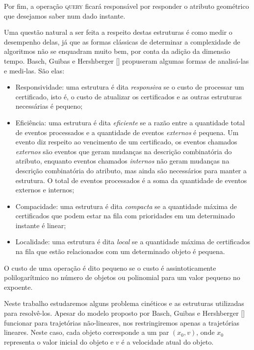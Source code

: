 Por fim, a operação \textsc{query} ficará responsável por responder o atributo
geométrico que desejamos saber num dado instante.

Uma questão natural a ser feita a respeito destas estruturas é como medir o
desempenho delas, já que as formas clássicas de determinar a complexidade de
algoritmos não se enquadram muito bem, por conta da adição da dimensão tempo.
Basch, Guibas e Hershberger [\cite{BASCH19991}] propuseram algumas formas de analisá-las e
medi-las.
São elas:
\begin{itemize}
    \item Responsividade: uma estrutura é dita \textit{responsiva} se o custo de
    processar um certificado, isto é, o custo de atualizar os certificados e as
    outras estruturas necessárias é pequeno;

    \item Eficiência: uma estrutura é dita \textit{eficiente} se a razão entre a
    quantidade total de eventos processados e a quantidade de eventos
    \textit{externos} é pequena.
    Um evento diz respeito ao vencimento de um certificado, os eventos chamados
    \textit{externos} são eventos que geram mudanças na descrição combinatória do atributo,
    enquanto eventos chamados \textit{internos} não geram mudanças na descrição combinatória
    do atributo, mas ainda são necessários para manter a estrutura.
    O total de eventos processados é a soma da quantidade de eventos externos e internos;

    \item Compacidade: uma estrutura é dita \textit{compacta} se a quantidade máxima de
    certificados que podem estar na fila com prioridades em um determinado instante é linear;

    \item Localidade: uma estrutura é dita \textit{local} se a quantidade máxima
    de certificados na fila que estão relacionados com um determinado objeto é
    pequena.
\end{itemize}

O custo de uma operação é dito pequeno se o custo é assintoticamente
polilogarítmico no número de objetos ou polinomial para um valor pequeno no expoente.

Neste trabalho estudaremos alguns problema cinéticos e as estruturas utilizadas
para resolvê-los.
Apesar do modelo proposto por Basch, Guibas e Hershberger [\cite{BASCH19991}]
funcionar para trajetórias não-lineares, nos restringiremos apenas a trajetórias
lineares.
Neste caso, cada objeto corresponde a um par $(x_0, v)$, onde $x_0$ representa
o valor inicial do objeto e $v$ é a velocidade atual do objeto.

